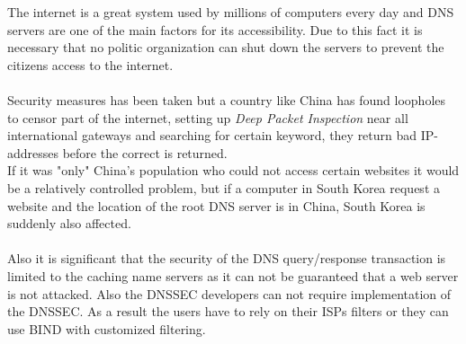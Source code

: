 \documentclass[Main]{subfiles}
\begin{document}
The internet is a great system used by millions of computers every day and DNS servers are one of the main factors for its accessibility. 
Due to this fact it is necessary that no politic organization can shut down the servers to prevent the citizens access to the internet.
\\
\\
Security measures has been taken but a country like China has found loopholes to censor part of the internet, setting up \textit{Deep Packet Inspection} near all international gateways and searching for certain keyword, they  return bad IP-addresses before the correct is returned\cite{GFW}.\\
If it was "only" China's population who could not access certain websites it would be a relatively controlled problem, but if a computer in South Korea request a website and the location of the root DNS server is in China, South Korea is suddenly also affected.
\\
\\
Also it is significant that the security of the DNS query/response transaction is limited to the caching name servers as it can not be guaranteed that a web server is not attacked. Also the DNSSEC developers can not require implementation of the DNSSEC. As a result the users have to rely on their ISPs filters or they can use BIND with customized filtering.
\end{document}
